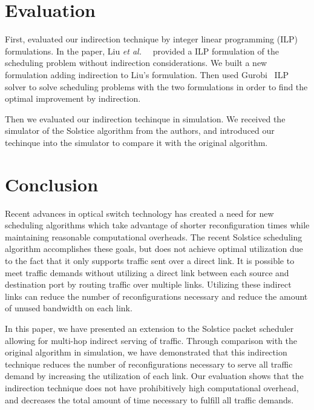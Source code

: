 \section{Evaluation}
\label{sec:goal}
First, evaluated our indirection technique by integer
linear programming (ILP) formulations. In the paper, Liu \textit{et al.\ }~\cite{Liu:2015}
provided a ILP formulation of the scheduling problem without indirection
considerations. We built a new formulation adding indirection to Liu's formulation.
Then used Gurobi~\cite{gurobi}
ILP solver to solve scheduling problems with the two formulations in order
to find the optimal improvement by indirection.

Then we evaluated our indirection techinque in simulation. We received the
simulator of the Solstice algorithm from the authors, and introduced
our techinque into the simulator to compare it with the original algorithm.


\section{Conclusion}
\label{sec:conclu}

Recent advances in optical switch technology has created a need for new scheduling
algorithms which take advantage of shorter reconfiguration times while maintaining
reasonable computational overheads. The recent Solstice scheduling algorithm
accomplishes these goals, but does not achieve optimal utilization due to the
fact that it only supports traffic sent over a direct link.
It is possible to meet traffic demands without utilizing a direct link between
each source and destination port by routing traffic over multiple links.
Utilizing these indirect links can reduce the number of reconfigurations necessary
and reduce the amount of unused bandwidth on each link.

In this paper, we have presented an extension to the Solstice packet scheduler allowing for
multi-hop indirect serving of traffic. Through comparison with the original
algorithm in simulation, we have demonstrated that
this indirection technique reduces the number of reconfigurations necessary to serve
all traffic demand by increasing the utilization of each link. 
Our evaluation shows that the indirection technique does not have prohibitively high
computational overhead, and decreases the total amount of time necessary to fulfill
all traffic demands. 
